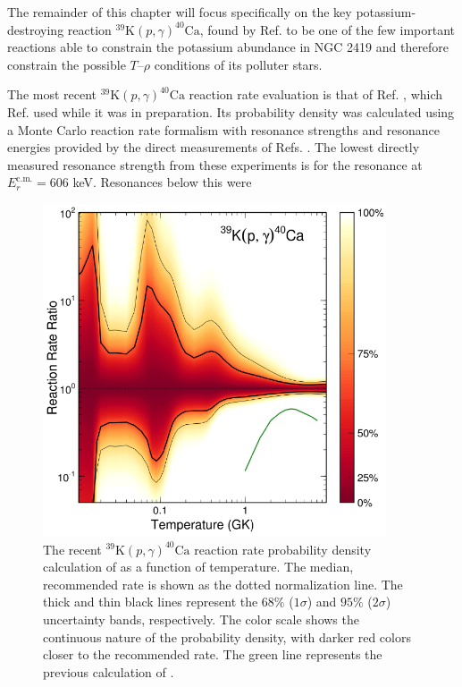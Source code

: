 The remainder of this chapter will focus specifically on the key potassium-destroying reaction $^{39}\mathrm{K}(p,\gamma)^{40}\mathrm{Ca}$, found by Ref. \cite{Dermigny2017} to be one of the few important reactions able to constrain the potassium abundance in NGC 2419 and therefore constrain the possible $T$--$\rho$ conditions of its polluter stars. 



The most recent $^{39}\mathrm{K}(p,\gamma)^{40}\mathrm{Ca}$ reaction rate evaluation is that of Ref. \cite{Longland2018}, which Ref. \cite{Dermigny2017} used while it was in preparation. Its probability density was calculated using a Monte Carlo reaction rate formalism \cite{Longland2010a} with resonance strengths and resonance energies provided by the direct measurements of Refs. \cite{Kikstra1990,Cheng1981,Leenhouts1966}. The lowest directly measured resonance strength from these experiments is for the resonance at $E^{\mathrm{c.m.}}_{r} = 606$ keV. Resonances below this were 


\begin{figure}[t]
\centering
\includegraphics[width=4in]{Chapter-6/figs/39K_p_g_Longland2018.png}
\caption{\label{fig:39K_p_g_Longland}The recent $^{39}\mathrm{K}(p,\gamma)^{40}\mathrm{Ca}$ reaction rate probability density calculation of \cite{Longland2018} as a function of temperature. The median, recommended rate is shown as the dotted normalization line. The thick and thin black lines represent the $68\%$ ($1\sigma$) and $95\%$ ($2\sigma$) uncertainty bands, respectively. The color scale shows the continuous nature of the probability density, with darker red colors closer to the recommended rate. The green line represents the previous calculation of \cite{Cheng1981}.}
\end{figure}

